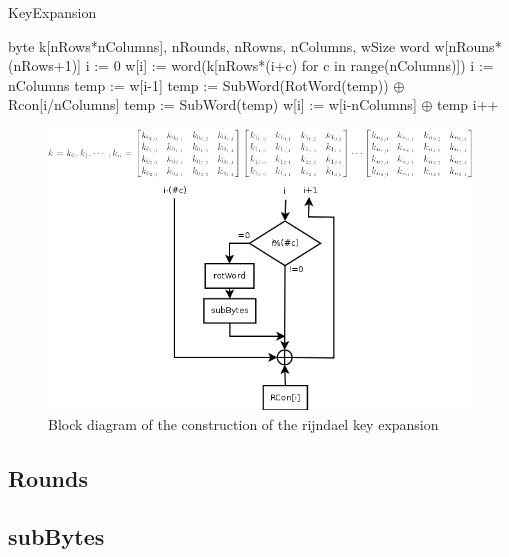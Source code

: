 \documentclass[a4paper,twoside]{llncs}
\begin{document}
\begin{algorithm}
 \caption{KeyExpansion}
 \label{alg:keyExpansion}
 \begin{algorithmic}[1]
  \REQUIRE byte k[nRows*nColumns], nRounds, nRowns, nColumns, wSize
  \ENSURE word w[nRouns*(nRows+1)]
  \STATE i := 0
    \STATE w[i] := word(k[nRows*(i+c) for c in range(nColumns)])
  \ENDWHILE
  \STATE i := nColumns
    \STATE temp := w[i-1]
      \STATE temp := SubWord(RotWord(temp)) $\oplus$ Rcon[i/nColumns]
    \ELSE
      \STATE temp := SubWord(temp)
    \ENDIF
    \STATE w[i] := w[i-nColumns] $\oplus$ temp
    \STATE i++
  \ENDWHILE
 \end{algorithmic}
\end{algorithm}

\begin{figure}[b]
 \centering
 \includegraphics[scale=0.5,keepaspectratio=true]{./images/rijndael_keyExpansionDiagram.png}
 \caption{Block diagram of the construction of the rijndael key expansion}
\label{fig:keyExpansionDiagram}
\end{figure}


\subsection{Rounds}

\subsection{subBytes}
\end{document}
